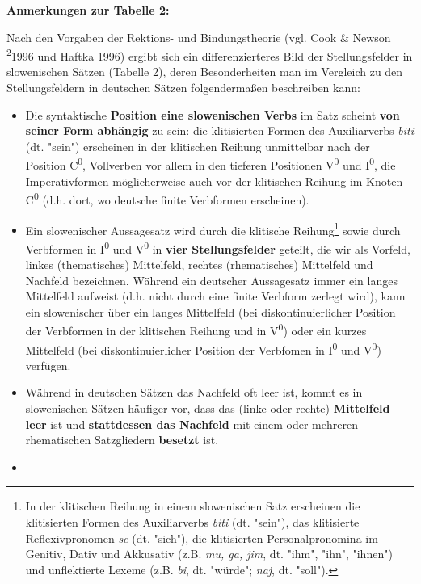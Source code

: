 \textbf{Anmerkungen zur Tabelle 2:}

Nach den Vorgaben der Rektions- und Bindungstheorie (vgl. Cook \& Newson
\textsuperscript{2}1996 und Haftka 1996) ergibt sich ein
differenzierteres Bild der Stellungsfelder in slowenischen Sätzen
(Tabelle 2), deren Besonderheiten man im Vergleich zu den
Stellungsfeldern in deutschen Sätzen folgendermaßen beschreiben kann:

\begin{itemize}
\item
  Die syntaktische \textbf{Position eine slowenischen Verbs} im Satz
  scheint \textbf{von seiner Form abhängig} zu sein: die klitisierten
  Formen des Auxiliarverbs \emph{biti} (dt. "sein") erscheinen in der
  klitischen Reihung unmittelbar nach der Position C\textsuperscript{0},
  Vollverben vor allem in den tieferen Positionen V\textsuperscript{0}
  und I\textsuperscript{0}, die Imperativformen möglicherweise auch vor
  der klitischen Reihung im Knoten C\textsuperscript{0} (d.h. dort, wo
  deutsche finite Verbformen erscheinen).
\item
  Ein slowenischer Aussagesatz wird durch die klitische
  Reihung\footnote{In der klitischen Reihung in einem slowenischen Satz
    erscheinen die klitisierten Formen des Auxiliarverbs \emph{biti}
    (dt. "sein"), das klitisierte Reflexivpronomen \emph{se} (dt.
    "sich"), die klitisierten Personalpronomina im Genitiv, Dativ und
    Akkusativ (z.B. \emph{mu, ga, jim}, dt. "ihm", "ihn", "ihnen") und
    unflektierte Lexeme (z.B. \emph{bi}, dt. "würde"; \emph{naj}, dt.
    "soll").} sowie durch Verbformen in I\textsuperscript{0} und
  V\textsuperscript{0} in \textbf{vier Stellungsfelder} geteilt, die wir
  als Vorfeld, linkes (thematisches) Mittelfeld, rechtes (rhematisches)
  Mittelfeld und Nachfeld bezeichnen. Während ein deutscher Aussagesatz
  immer ein langes Mittelfeld aufweist (d.h. nicht durch eine finite
  Verbform zerlegt wird), kann ein slowenischer über ein langes
  Mittelfeld (bei diskontinuierlicher Position der Verbformen in der
  klitischen Reihung und in V\textsuperscript{0}) oder ein kurzes
  Mittelfeld (bei diskontinuierlicher Position der Verbfomen in
  I\textsuperscript{0} und V\textsuperscript{0}) verfügen.
\item
  Während in deutschen Sätzen das Nachfeld oft leer ist, kommt es in
  slowenischen Sätzen häufiger vor, dass das (linke oder rechte)
  \textbf{Mittelfeld leer} ist und \textbf{stattdessen das Nachfeld} mit
  einem oder mehreren rhematischen Satzgliedern \textbf{besetzt} ist.
\item

\end{itemize}
